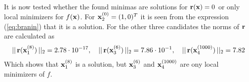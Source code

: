 It is now tested whether the found minimas are solutions for $\mathbf{r}(\mathbf{x})=0$ or only local minimizers for $f(\mathbf{x})$. For $\mathbf{x}_2^{(0)}=(1,0)^T$ it is seen from the expression (\ref{eq:branin}) that it is a solution. For the other three candidates the norms of $\mathbf{r}$ are calculated as
\begin{gather*}
    ||\,\mathbf{r}(\mathbf{x}_1^{(8)})\,||_2 = 2.78\cdot 10^{-17}, \quad 
    ||\,\mathbf{r}(\mathbf{x}_3^{(6)})\,||_2 = 7.86\cdot 10^{-1}, \quad||\,\mathbf{r}(\mathbf{x}_4^{(1000)})\,||_2 = 7.82
\end{gather*}
Which shows that $\mathbf{x}_1^{(8)}$ is a solution, but $\mathbf{x}_3^{(6)}$ and $\mathbf{x}_4^{(1000)}$ are ony local minimizers of $f$.
\begin{figure}
    \centering
    \mbox{ \quad {}}
    \mbox{ \quad {}}

\end{figure}
